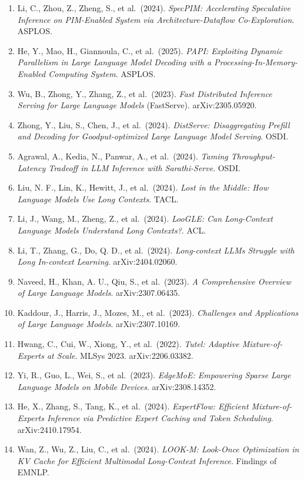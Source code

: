 \begin{enumerate}
\item
  Li, C., Zhou, Z., Zheng, S., et al.~(2024). \emph{SpecPIM: Accelerating Speculative Inference on PIM-Enabled System via Architecture-Dataflow Co-Exploration}. ASPLOS.
\item
  He, Y., Mao, H., Giannoula, C., et al.~(2025). \emph{PAPI: Exploiting Dynamic Parallelism in Large Language Model Decoding with a Processing-In-Memory-Enabled Computing System}. ASPLOS.
\item
  Wu, B., Zhong, Y., Zhang, Z., et al.~(2023). \emph{Fast Distributed Inference Serving for Large Language Models} (FastServe). arXiv:2305.05920.
\item
  Zhong, Y., Liu, S., Chen, J., et al.~(2024). \emph{DistServe: Disaggregating Prefill and Decoding for Goodput-optimized Large Language Model Serving}. OSDI.
\item
  Agrawal, A., Kedia, N., Panwar, A., et al.~(2024). \emph{Taming Throughput-Latency Tradeoff in LLM Inference with Sarathi-Serve}. OSDI.
\item
  Liu, N. F., Lin, K., Hewitt, J., et al.~(2024). \emph{Lost in the Middle: How Language Models Use Long Contexts}. TACL.
\item
  Li, J., Wang, M., Zheng, Z., et al.~(2024). \emph{LooGLE: Can Long-Context Language Models Understand Long Contexts?}. ACL.
\item
  Li, T., Zhang, G., Do, Q. D., et al.~(2024). \emph{Long-context LLMs Struggle with Long In-context Learning}. arXiv:2404.02060.
\item
  Naveed, H., Khan, A. U., Qiu, S., et al.~(2023). \emph{A Comprehensive Overview of Large Language Models}. arXiv:2307.06435.
\item
  Kaddour, J., Harris, J., Mozes, M., et al.~(2023). \emph{Challenges and Applications of Large Language Models}. arXiv:2307.10169.
\item
  Hwang, C., Cui, W., Xiong, Y., et al.~(2022). \emph{Tutel: Adaptive Mixture-of-Experts at Scale}. MLSys 2023. arXiv:2206.03382.
\item
  Yi, R., Guo, L., Wei, S., et al.~(2023). \emph{EdgeMoE: Empowering Sparse Large Language Models on Mobile Devices}. arXiv:2308.14352.
\item
  He, X., Zhang, S., Tang, K., et al.~(2024). \emph{ExpertFlow: Efficient Mixture-of-Experts Inference via Predictive Expert Caching and Token Scheduling}. arXiv:2410.17954.
\item
  Wan, Z., Wu, Z., Liu, C., et al.~(2024). \emph{LOOK-M: Look-Once Optimization in KV Cache for Efficient Multimodal Long-Context Inference}. Findings of EMNLP.

\end{enumerate}
